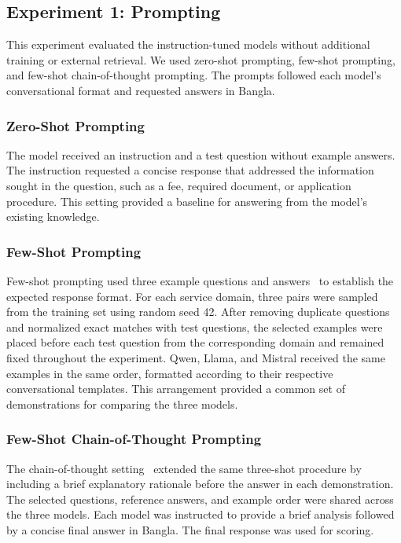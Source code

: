 \documentclass[10pt,journal,compsoc]{IEEEtran}
\begin{document}
\subsection{Experiment 1: Prompting}
\label{exp:1}

This experiment evaluated the instruction-tuned models without additional training or external retrieval. We used zero-shot prompting, few-shot prompting, and few-shot chain-of-thought prompting. The prompts followed each model's conversational format and requested answers in Bangla.

\subsubsection{Zero-Shot Prompting}

The model received an instruction and a test question without example answers. The instruction requested a concise response that addressed the information sought in the question, such as a fee, required document, or application procedure. This setting provided a baseline for answering from the model's existing knowledge.

\subsubsection{Few-Shot Prompting}

Few-shot prompting used three example questions and answers~\cite{meth_brown2020fewshot} to establish the expected response format. For each service domain, three pairs were sampled from the training set using random seed 42. After removing duplicate questions and normalized exact matches with test questions, the selected examples were placed before each test question from the corresponding domain and remained fixed throughout the experiment. Qwen, Llama, and Mistral received the same examples in the same order, formatted according to their respective conversational templates. This arrangement provided a common set of demonstrations for comparing the three models.

\subsubsection{Few-Shot Chain-of-Thought Prompting}

The chain-of-thought setting~\cite{meth_wei2022cot} extended the same three-shot procedure by including a brief explanatory rationale before the answer in each demonstration. The selected questions, reference answers, and example order were shared across the three models. Each model was instructed to provide a brief analysis followed by a concise final answer in Bangla. The final response was used for scoring.
\end{document}
